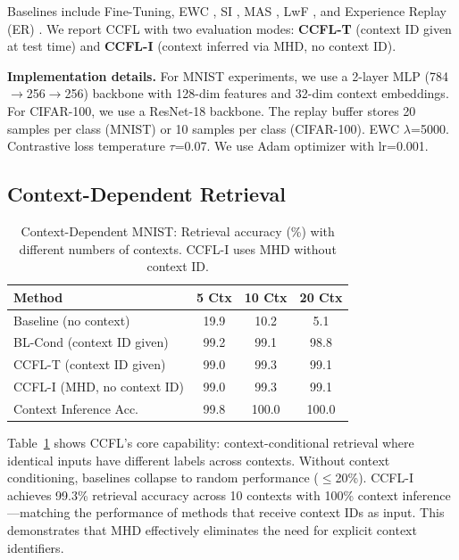 \documentclass[letterpaper, 10pt, times]{article}
\begin{document}
Baselines include Fine-Tuning, EWC \cite{kirkpatrick2017overcoming}, SI \cite{zenke2017continual}, MAS \cite{aljundi2018memory}, LwF \cite{li2017learning}, and Experience Replay (ER) \cite{chaudhry2019efficient}. We report CCFL with two evaluation modes: \textbf{CCFL-T} (context ID given at test time) and \textbf{CCFL-I} (context inferred via MHD, no context ID).

\textbf{Implementation details.} For MNIST experiments, we use a 2-layer MLP (784$\to$256$\to$256) backbone with 128-dim features and 32-dim context embeddings. For CIFAR-100, we use a ResNet-18 backbone. The replay buffer stores 20 samples per class (MNIST) or 10 samples per class (CIFAR-100). EWC $\lambda$=5000. Contrastive loss temperature $\tau$=0.07. We use Adam optimizer with lr=0.001.

\subsection{Context-Dependent Retrieval}

\begin{table}[t]
\centering
\caption{Context-Dependent MNIST: Retrieval accuracy (\%) with different numbers of contexts. CCFL-I uses MHD without context ID.}
\label{tab:ctx_dep}
\begin{tabular}{lccc}
\toprule
Method & 5 Ctx & 10 Ctx & 20 Ctx \\
\midrule
Baseline (no context) & 19.9 & 10.2 & 5.1 \\
BL-Cond (context ID given) & 99.2 & 99.1 & 98.8 \\
\midrule
CCFL-T (context ID given) & 99.0 & 99.3 & 99.1 \\
CCFL-I (MHD, no context ID) & 99.0 & 99.3 & 99.1 \\
Context Inference Acc. & 99.8 & 100.0 & 100.0 \\
\bottomrule
\end{tabular}
\end{table}

Table~\ref{tab:ctx_dep} shows CCFL's core capability: context-conditional retrieval where identical inputs have different labels across contexts. Without context conditioning, baselines collapse to random performance ($\leq$20\%). CCFL-I achieves 99.3\% retrieval accuracy across 10 contexts with 100\% context inference---matching the performance of methods that receive context IDs as input. This demonstrates that MHD effectively eliminates the need for explicit context identifiers.
\end{document}
